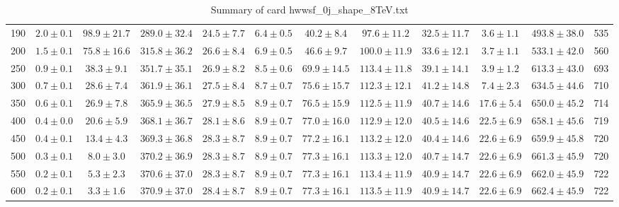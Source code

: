 \begin{table}[!htb]
{\begin{center}
\begin{tabular}{l | c c | c c c c c c c | c c}
190 & $2.0\pm0.1$ & $98.9\pm21.7$ & $289.0\pm32.4$ & $24.5\pm7.7$ & $6.4\pm0.5$ & $40.2\pm8.4$ & $97.6\pm11.2$ & $32.5\pm11.7$ & $3.6\pm1.1$ & $493.8\pm38.0$ & 535 \\
200 & $1.5\pm0.1$ & $75.8\pm16.6$ & $315.8\pm36.2$ & $26.6\pm8.4$ & $6.9\pm0.5$ & $46.6\pm9.7$ & $100.0\pm11.9$ & $33.6\pm12.1$ & $3.7\pm1.1$ & $533.1\pm42.0$ & 560 \\
250 & $0.9\pm0.1$ & $38.3\pm9.1$ & $351.7\pm35.1$ & $26.9\pm8.2$ & $8.5\pm0.6$ & $69.9\pm14.5$ & $113.4\pm11.8$ & $39.1\pm14.1$ & $3.9\pm1.2$ & $613.3\pm43.0$ & 693 \\
300 & $0.7\pm0.1$ & $28.6\pm7.4$ & $361.9\pm36.1$ & $27.5\pm8.4$ & $8.7\pm0.7$ & $75.6\pm15.7$ & $112.3\pm12.1$ & $41.2\pm14.8$ & $7.4\pm2.3$ & $634.5\pm44.6$ & 710 \\
350 & $0.6\pm0.1$ & $26.9\pm7.8$ & $365.9\pm36.5$ & $27.9\pm8.5$ & $8.9\pm0.7$ & $76.5\pm15.9$ & $112.5\pm11.9$ & $40.7\pm14.6$ & $17.6\pm5.4$ & $650.0\pm45.2$ & 714 \\
400 & $0.4\pm0.0$ & $20.6\pm5.9$ & $368.1\pm36.7$ & $28.1\pm8.6$ & $8.9\pm0.7$ & $77.0\pm16.0$ & $112.9\pm12.0$ & $40.5\pm14.6$ & $22.5\pm6.9$ & $658.1\pm45.6$ & 719 \\
450 & $0.4\pm0.1$ & $13.4\pm4.3$ & $369.3\pm36.8$ & $28.3\pm8.7$ & $8.9\pm0.7$ & $77.2\pm16.1$ & $113.2\pm12.0$ & $40.4\pm14.6$ & $22.6\pm6.9$ & $659.9\pm45.8$ & 720 \\
500 & $0.3\pm0.1$ & $8.0\pm3.0$ & $370.2\pm36.9$ & $28.3\pm8.7$ & $8.9\pm0.7$ & $77.3\pm16.1$ & $113.3\pm12.0$ & $40.7\pm14.7$ & $22.6\pm6.9$ & $661.3\pm45.9$ & 720 \\
550 & $0.2\pm0.1$ & $5.3\pm2.3$ & $370.6\pm37.0$ & $28.3\pm8.7$ & $8.9\pm0.7$ & $77.3\pm16.1$ & $113.4\pm11.9$ & $40.9\pm14.7$ & $22.6\pm6.9$ & $662.0\pm45.9$ & 722 \\
600 & $0.2\pm0.1$ & $3.3\pm1.6$ & $370.9\pm37.0$ & $28.4\pm8.7$ & $8.9\pm0.7$ & $77.3\pm16.1$ & $113.5\pm11.9$ & $40.9\pm14.7$ & $22.6\pm6.9$ & $662.4\pm45.9$ & 722 \\
\hline
\end{tabular}
\end{center}
}
\caption{Summary of card hwwsf\_0j\_shape\_8TeV.txt}
\end{table}
